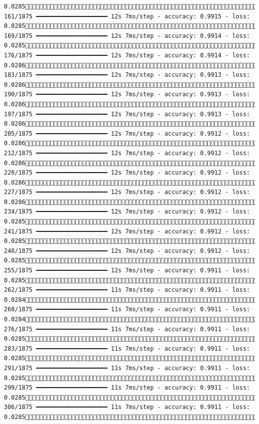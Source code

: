 \documentclass[
  letterpaper,
  DIV=11,
  numbers=noendperiod]{scrreprt}
\begin{document}
\begin{verbatim}
0.0285 161/1875 ━━━━━━━━━━━━━━━━━━━━ 12s 7ms/step - accuracy: 0.9915 - loss: 0.0285 169/1875 ━━━━━━━━━━━━━━━━━━━━ 12s 7ms/step - accuracy: 0.9914 - loss: 0.0285 176/1875 ━━━━━━━━━━━━━━━━━━━━ 12s 7ms/step - accuracy: 0.9914 - loss: 0.0286 183/1875 ━━━━━━━━━━━━━━━━━━━━ 12s 7ms/step - accuracy: 0.9913 - loss: 0.0286 190/1875 ━━━━━━━━━━━━━━━━━━━━ 12s 7ms/step - accuracy: 0.9913 - loss: 0.0286 197/1875 ━━━━━━━━━━━━━━━━━━━━ 12s 7ms/step - accuracy: 0.9913 - loss: 0.0286 205/1875 ━━━━━━━━━━━━━━━━━━━━ 12s 7ms/step - accuracy: 0.9912 - loss: 0.0286 212/1875 ━━━━━━━━━━━━━━━━━━━━ 12s 7ms/step - accuracy: 0.9912 - loss: 0.0286 220/1875 ━━━━━━━━━━━━━━━━━━━━ 12s 7ms/step - accuracy: 0.9912 - loss: 0.0286 227/1875 ━━━━━━━━━━━━━━━━━━━━ 12s 7ms/step - accuracy: 0.9912 - loss: 0.0286 234/1875 ━━━━━━━━━━━━━━━━━━━━ 12s 7ms/step - accuracy: 0.9912 - loss: 0.0285 241/1875 ━━━━━━━━━━━━━━━━━━━━ 12s 7ms/step - accuracy: 0.9912 - loss: 0.0285 248/1875 ━━━━━━━━━━━━━━━━━━━━ 12s 7ms/step - accuracy: 0.9912 - loss: 0.0285 255/1875 ━━━━━━━━━━━━━━━━━━━━ 12s 7ms/step - accuracy: 0.9911 - loss: 0.0285 262/1875 ━━━━━━━━━━━━━━━━━━━━ 11s 7ms/step - accuracy: 0.9911 - loss: 0.0284 268/1875 ━━━━━━━━━━━━━━━━━━━━ 11s 7ms/step - accuracy: 0.9911 - loss: 0.0284 276/1875 ━━━━━━━━━━━━━━━━━━━━ 11s 7ms/step - accuracy: 0.9911 - loss: 0.0285 283/1875 ━━━━━━━━━━━━━━━━━━━━ 11s 7ms/step - accuracy: 0.9911 - loss: 0.0285 291/1875 ━━━━━━━━━━━━━━━━━━━━ 11s 7ms/step - accuracy: 0.9911 - loss: 0.0285 299/1875 ━━━━━━━━━━━━━━━━━━━━ 11s 7ms/step - accuracy: 0.9911 - loss: 0.0285 306/1875 ━━━━━━━━━━━━━━━━━━━━ 11s 7ms/step - accuracy: 0.9911 - loss: 0.0285 
\end{verbatim}
\end{document}
